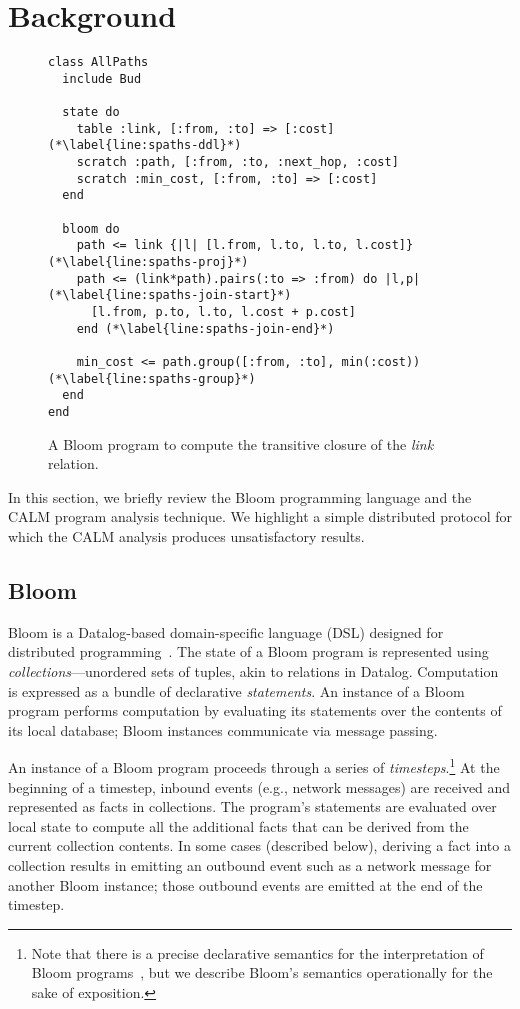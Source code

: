 \section{Background}
\label{sec:background}

\begin{figure}[t]
\begin{scriptsize}
\begin{lstlisting}
class AllPaths
  include Bud

  state do
    table :link, [:from, :to] => [:cost] (*\label{line:spaths-ddl}*)
    scratch :path, [:from, :to, :next_hop, :cost]
    scratch :min_cost, [:from, :to] => [:cost]
  end

  bloom do
    path <= link {|l| [l.from, l.to, l.to, l.cost]} (*\label{line:spaths-proj}*)
    path <= (link*path).pairs(:to => :from) do |l,p| (*\label{line:spaths-join-start}*)
      [l.from, p.to, l.to, l.cost + p.cost]
    end (*\label{line:spaths-join-end}*)

    min_cost <= path.group([:from, :to], min(:cost)) (*\label{line:spaths-group}*)
  end
end
\end{lstlisting}
\end{scriptsize}
\caption{A Bloom program to compute the transitive closure of the
  \emph{link} relation.}
\label{fig:bloom-spaths}
\end{figure}

In this section, we briefly review the Bloom programming language and the CALM
program analysis technique.  We highlight a simple distributed protocol for
which the CALM analysis produces unsatisfactory results.

\subsection{Bloom}
\label{sec:bg-bloom}

Bloom is a Datalog-based domain-specific language (DSL) designed for distributed
programming~\cite{Alvaro2011,bloom}. The state of a Bloom program is represented
using \emph{collections}---unordered sets of tuples, akin to relations in
Datalog. Computation is expressed as a bundle of declarative \emph{statements}.
An instance of a Bloom program performs computation by evaluating its statements
over the contents of its local database; Bloom instances communicate via message
passing.

An instance of a Bloom program proceeds through a series of
\emph{timesteps}.\footnote{Note that there is a precise declarative semantics
  for the interpretation of Bloom programs~\cite{dedalus}, but we describe
  Bloom's semantics operationally for the sake of exposition.} At the beginning
of a timestep, inbound events (e.g., network messages) are received and
represented as facts in collections. The program's statements are evaluated over
local state to compute all the additional facts that can be derived from the
current collection contents. In some cases (described below), deriving a fact
into a collection results in emitting an outbound event such as a network
message for another Bloom instance; those outbound events are emitted at the end
of the timestep.

